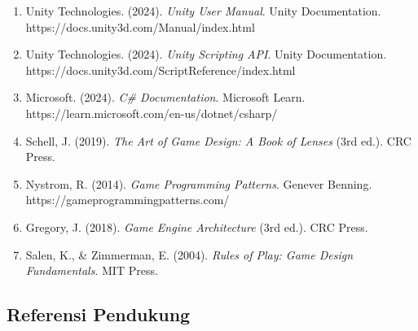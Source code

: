 \documentclass[a4paper,12pt]{article}
\begin{document}
\begin{enumerate}
\item Unity Technologies. (2024). \textit{Unity User Manual}. Unity Documentation. https://docs.unity3d.com/Manual/index.html

\item Unity Technologies. (2024). \textit{Unity Scripting API}. Unity Documentation. https://docs.unity3d.com/ScriptReference/index.html

\item Microsoft. (2024). \textit{C\# Documentation}. Microsoft Learn. https://learn.microsoft.com/en-us/dotnet/csharp/

\item Schell, J. (2019). \textit{The Art of Game Design: A Book of Lenses} (3rd ed.). CRC Press.

\item Nystrom, R. (2014). \textit{Game Programming Patterns}. Genever Benning. https://gameprogrammingpatterns.com/

\item Gregory, J. (2018). \textit{Game Engine Architecture} (3rd ed.). CRC Press.

\item Salen, K., \& Zimmerman, E. (2004). \textit{Rules of Play: Game Design Fundamentals}. MIT Press.
\end{enumerate}

\subsection{Referensi Pendukung}
\end{document}
